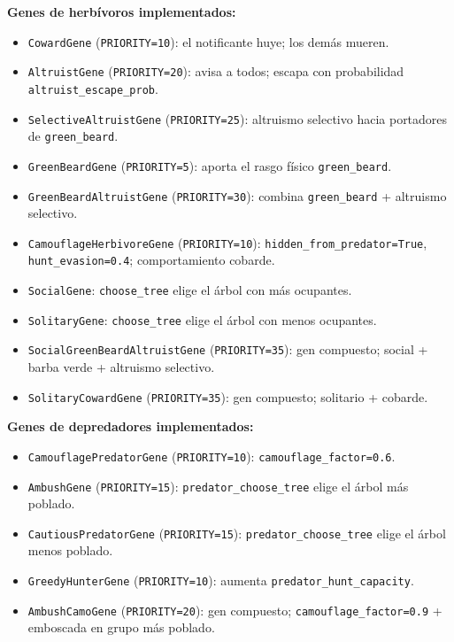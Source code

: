 \documentclass[11pt,a4paper]{article}
\begin{document}
\textbf{Genes de herb\'ivoros implementados:}
\begin{itemize}
	\item \texttt{CowardGene} (\texttt{PRIORITY=10}): el notificante huye; los dem\'as mueren.
	\item \texttt{AltruistGene} (\texttt{PRIORITY=20}): avisa a todos; escapa con probabilidad \texttt{altruist\_escape\_prob}.
	\item \texttt{SelectiveAltruistGene} (\texttt{PRIORITY=25}): altruismo selectivo hacia portadores de \texttt{green\_beard}.
	\item \texttt{GreenBeardGene} (\texttt{PRIORITY=5}): aporta el rasgo f\'isico \texttt{green\_beard}.
	\item \texttt{GreenBeardAltruistGene} (\texttt{PRIORITY=30}): combina \texttt{green\_beard} + altruismo selectivo.
	\item \texttt{CamouflageHerbivoreGene} (\texttt{PRIORITY=10}): \texttt{hidden\_from\_predator=True},
	\texttt{hunt\_evasion=0.4}; comportamiento cobarde.
	\item \texttt{SocialGene}: \texttt{choose\_tree} elige el \'arbol con m\'as ocupantes.
	\item \texttt{SolitaryGene}: \texttt{choose\_tree} elige el \'arbol con menos ocupantes.
	\item \texttt{SocialGreenBeardAltruistGene} (\texttt{PRIORITY=35}): gen compuesto; social + barba verde + altruismo selectivo.
	\item \texttt{SolitaryCowardGene} (\texttt{PRIORITY=35}): gen compuesto; solitario + cobarde.
\end{itemize}

\textbf{Genes de depredadores implementados:}
\begin{itemize}
	\item \texttt{CamouflagePredatorGene} (\texttt{PRIORITY=10}): \texttt{camouflage\_factor=0.6}.
	\item \texttt{AmbushGene} (\texttt{PRIORITY=15}): \texttt{predator\_choose\_tree} elige el \'arbol m\'as poblado.
	\item \texttt{CautiousPredatorGene} (\texttt{PRIORITY=15}): \texttt{predator\_choose\_tree} elige el \'arbol menos poblado.
	\item \texttt{GreedyHunterGene} (\texttt{PRIORITY=10}): aumenta \texttt{predator\_hunt\_capacity}.
	\item \texttt{AmbushCamoGene} (\texttt{PRIORITY=20}): gen compuesto; \texttt{camouflage\_factor=0.9} + emboscada en grupo m\'as poblado.
\end{itemize}
\end{document}
